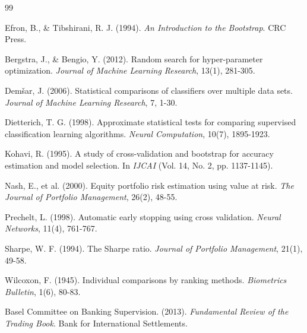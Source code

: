 \documentclass[12pt]{article}
\begin{document}

\begin{thebibliography}{99}

Efron, B., \& Tibshirani, R. J. (1994). \textit{An Introduction to the Bootstrap}. CRC Press.

Bergstra, J., \& Bengio, Y. (2012). Random search for hyper-parameter optimization. \textit{Journal of Machine Learning Research}, 13(1), 281-305.

Demšar, J. (2006). Statistical comparisons of classifiers over multiple data sets. \textit{Journal of Machine Learning Research}, 7, 1-30.

Dietterich, T. G. (1998). Approximate statistical tests for comparing supervised classification learning algorithms. \textit{Neural Computation}, 10(7), 1895-1923.

Kohavi, R. (1995). A study of cross-validation and bootstrap for accuracy estimation and model selection. In \textit{IJCAI} (Vol. 14, No. 2, pp. 1137-1145).

Nash, E., et al. (2000). Equity portfolio risk estimation using value at risk. \textit{The Journal of Portfolio Management}, 26(2), 48-55.

Prechelt, L. (1998). Automatic early stopping using cross validation. \textit{Neural Networks}, 11(4), 761-767.

Sharpe, W. F. (1994). The Sharpe ratio. \textit{Journal of Portfolio Management}, 21(1), 49-58.

Wilcoxon, F. (1945). Individual comparisons by ranking methods. \textit{Biometrics Bulletin}, 1(6), 80-83.

Basel Committee on Banking Supervision. (2013). \textit{Fundamental Review of the Trading Book}. Bank for International Settlements.

\end{thebibliography}
\end{document}
